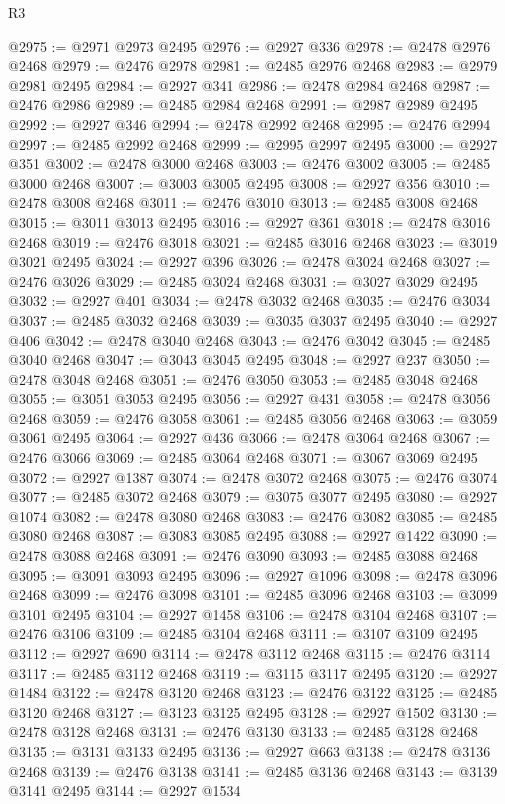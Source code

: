 \begin{lexlean}{R3}
\begin{coremodule}
@2975 := @2971 @2973 @2495
@2976 := @2927 @336
@2978 := @2478 @2976 @2468
@2979 := @2476 @2978
@2981 := @2485 @2976 @2468
@2983 := @2979 @2981 @2495
@2984 := @2927 @341
@2986 := @2478 @2984 @2468
@2987 := @2476 @2986
@2989 := @2485 @2984 @2468
@2991 := @2987 @2989 @2495
@2992 := @2927 @346
@2994 := @2478 @2992 @2468
@2995 := @2476 @2994
@2997 := @2485 @2992 @2468
@2999 := @2995 @2997 @2495
@3000 := @2927 @351
@3002 := @2478 @3000 @2468
@3003 := @2476 @3002
@3005 := @2485 @3000 @2468
@3007 := @3003 @3005 @2495
@3008 := @2927 @356
@3010 := @2478 @3008 @2468
@3011 := @2476 @3010
@3013 := @2485 @3008 @2468
@3015 := @3011 @3013 @2495
@3016 := @2927 @361
@3018 := @2478 @3016 @2468
@3019 := @2476 @3018
@3021 := @2485 @3016 @2468
@3023 := @3019 @3021 @2495
@3024 := @2927 @396
@3026 := @2478 @3024 @2468
@3027 := @2476 @3026
@3029 := @2485 @3024 @2468
@3031 := @3027 @3029 @2495
@3032 := @2927 @401
@3034 := @2478 @3032 @2468
@3035 := @2476 @3034
@3037 := @2485 @3032 @2468
@3039 := @3035 @3037 @2495
@3040 := @2927 @406
@3042 := @2478 @3040 @2468
@3043 := @2476 @3042
@3045 := @2485 @3040 @2468
@3047 := @3043 @3045 @2495
@3048 := @2927 @237
@3050 := @2478 @3048 @2468
@3051 := @2476 @3050
@3053 := @2485 @3048 @2468
@3055 := @3051 @3053 @2495
@3056 := @2927 @431
@3058 := @2478 @3056 @2468
@3059 := @2476 @3058
@3061 := @2485 @3056 @2468
@3063 := @3059 @3061 @2495
@3064 := @2927 @436
@3066 := @2478 @3064 @2468
@3067 := @2476 @3066
@3069 := @2485 @3064 @2468
@3071 := @3067 @3069 @2495
@3072 := @2927 @1387
@3074 := @2478 @3072 @2468
@3075 := @2476 @3074
@3077 := @2485 @3072 @2468
@3079 := @3075 @3077 @2495
@3080 := @2927 @1074
@3082 := @2478 @3080 @2468
@3083 := @2476 @3082
@3085 := @2485 @3080 @2468
@3087 := @3083 @3085 @2495
@3088 := @2927 @1422
@3090 := @2478 @3088 @2468
@3091 := @2476 @3090
@3093 := @2485 @3088 @2468
@3095 := @3091 @3093 @2495
@3096 := @2927 @1096
@3098 := @2478 @3096 @2468
@3099 := @2476 @3098
@3101 := @2485 @3096 @2468
@3103 := @3099 @3101 @2495
@3104 := @2927 @1458
@3106 := @2478 @3104 @2468
@3107 := @2476 @3106
@3109 := @2485 @3104 @2468
@3111 := @3107 @3109 @2495
@3112 := @2927 @690
@3114 := @2478 @3112 @2468
@3115 := @2476 @3114
@3117 := @2485 @3112 @2468
@3119 := @3115 @3117 @2495
@3120 := @2927 @1484
@3122 := @2478 @3120 @2468
@3123 := @2476 @3122
@3125 := @2485 @3120 @2468
@3127 := @3123 @3125 @2495
@3128 := @2927 @1502
@3130 := @2478 @3128 @2468
@3131 := @2476 @3130
@3133 := @2485 @3128 @2468
@3135 := @3131 @3133 @2495
@3136 := @2927 @663
@3138 := @2478 @3136 @2468
@3139 := @2476 @3138
@3141 := @2485 @3136 @2468
@3143 := @3139 @3141 @2495
@3144 := @2927 @1534

\end{coremodule}
\end{lexlean}
